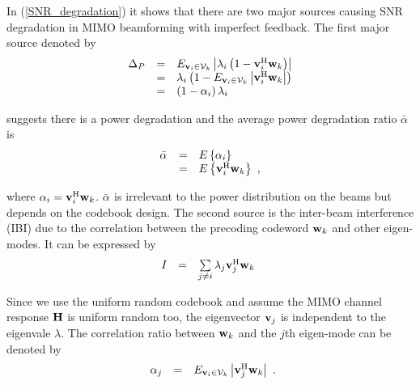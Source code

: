 \documentclass[a4paper,10pt,fleqn, twocolumn]{IEEEtran}
\newcommand{\bv}{{\bf v}}
\newcommand{\bw}{{\bf w}}
\newcommand{\bH}{{\bf H}}
\begin{document}
In (\ref{SNR_degradation}) it shows that there are two major
sources causing SNR degradation in MIMO beamforming with imperfect
feedback. The first major source denoted by
\begin{equation}
\begin{array}{rcl}
\Delta_{P}&=&\mbox{E}_{\bv_{i}\in{\cal
V}_{k}}\left|\lambda_{i}\left(1-\bv_{i}^{\rm
H}\bw_k\right)\right|\\
&=&\lambda_{i}\left(1-\mbox{E}_{\bv_{i}\in{\cal
V}_{k}}\left|\bv_{i}^{\rm H}\bw_k\right|\right)\\
&=&\left(1-\alpha_{i}\right)\lambda_{i}\\
\end{array}
\end{equation}

\noindent suggests there is a power degradation and the average
power degradation ratio $\bar{\alpha}_{}$ is
\begin{equation}
\begin{array}{rcl}
\bar{\alpha}_{}&=&\mbox{E}\left\{\alpha_{i}\right\}\\
&=&\mbox{E}\left\{\bv_{i}^{\rm H}\bw_k\right\}\ ,
\end{array}\label{alpha}
\end{equation}

\noindent where $\alpha_{i}=\bv_{i}^{\rm H}\bw_k$.
$\bar{\alpha}_{}$ is irrelevant to the power distribution on the
beams but depends on the codebook design. The second source is the
inter-beam interference (IBI) due to the correlation between the
precoding codeword $\bw_{k}$ and other eigen-modes. It can be
expressed by
\begin{equation}
\begin{array}{rcl}
I_{} & = & \sum\limits_{j\neq i}\lambda_{j}\bv_{j}^{\rm H}\bw_{k}\
\end{array}\label{IBI}
\end{equation}

\noindent  Since we use the uniform random codebook and assume the
MIMO channel response $\bH$ is uniform random too, the eigenvector
$\bv_{j}$ is independent to the eigenvale $\lambda$. The
correlation ratio between $\bw_{k}$ and the $j$th eigen-mode can
be denoted by
\begin{equation}
\begin{array}{rcl}
\alpha_{j}&=&\mbox{E}_{\bv_{i}\in{\cal V}_{k}}\left|\bv_{j}^{\rm
H}\bw_k\right|
\end{array}.\label{alpha_j}
\end{equation}
\end{document}
